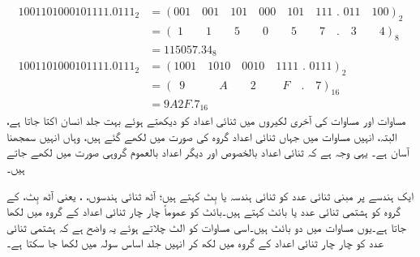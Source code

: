  \begin{align*}
 1001101000101111.0111_2&=(001\quad 001\quad 101\quad 000\quad 101\quad 111\,\, . \,\,011\quad 100)_2\\
 &=(\,\,1\quad \quad 1\quad \quad 5\quad \quad 0 \quad \quad 5\quad \quad 7\quad .\quad 3\quad \quad 4)_8\\
 &=115057.34_8\\
 1001101000101111.0111_2&=(1001\quad 1010\quad 0010\quad 1111\,\, . \,\,0111)_2\\
 &=(\,\,\,9\quad \quad \quad A\quad \quad 2\quad \quad \,\,F \quad . \quad 7)_{16}\\
 &=9A2F.7_{16}
 \end{align*}
	مساوات  اور مساوات  کی آخری لکیروں میں ثنائی اعداد کو دیکھتے ہوئے بہت جلد انسان اکتا جاتا ہے، البتہ، انہیں مساوات میں جہاں ثنائی اعداد گروہ کی صورت میں لکھے گئے ہیں، وہاں انہیں سمجھنا آسان ہے۔ یہی وجہ ہے کہ ثنائی اعداد بالخصوص اور دیگر اعداد بالعموم گروہی صورت میں لکھے جاتے ہیں۔
	
ایک ہندسے پر مبنی ثنائی عدد کو ثنائی ہندسہ یا بِٹ کہتے ہیں؛ آٹھ ثنائی ہندسوں، ، یعنی آٹھ بِٹ، کے گروہ کو ہشتمی ثنائی عدد یا بائٹ کہتے ہیں۔بائٹ کو عموماً چار چار ثنائی اعداد کے گروہ میں لکھا جاتا ہے۔یوں مساوات  میں دو بائٹ ہیں۔اسی مساوات کو الٹ چلاتے ہوئے یہ واضح ہے کہ ہشتمی ثنائی عدد کو چار چار ثنائی اعداد کے گروہ میں لکھ کر انہیں جلد اساس سولہ میں لکھا جا سکتا ہے۔

